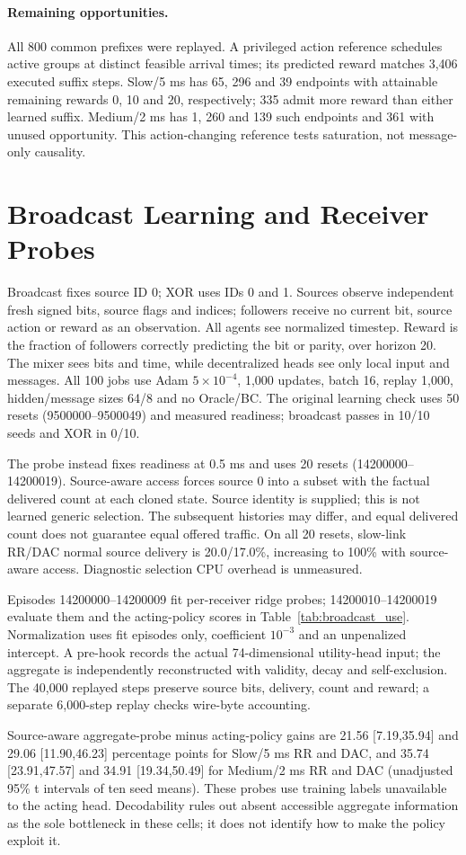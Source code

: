 \documentclass[10pt]{article}
\begin{document}
\paragraph{Remaining opportunities.}
All 800 common prefixes were replayed. A privileged action reference schedules active groups at distinct feasible arrival times; its predicted reward matches 3,406 executed suffix steps. Slow/5 ms has 65, 296 and 39 endpoints with attainable remaining rewards 0, 10 and 20, respectively; 335 admit more reward than either learned suffix. Medium/2 ms has 1, 260 and 139 such endpoints and 361 with unused opportunity. This action-changing reference tests saturation, not message-only causality.

\section{Broadcast Learning and Receiver Probes}\label{app:probe}
Broadcast fixes source ID 0; XOR uses IDs 0 and 1. Sources observe independent fresh signed bits, source flags and indices; followers receive no current bit, source action or reward as an observation. All agents see normalized timestep. Reward is the fraction of followers correctly predicting the bit or parity, over horizon 20. The mixer sees bits and time, while decentralized heads see only local input and messages. All 100 jobs use Adam $5\times10^{-4}$, 1,000 updates, batch 16, replay 1,000, hidden/message sizes 64/8 and no Oracle/BC. The original learning check uses 50 resets (9500000--9500049) and measured readiness; broadcast passes in 10/10 seeds and XOR in 0/10.

The probe instead fixes readiness at 0.5 ms and uses 20 resets (14200000--14200019). Source-aware access forces source 0 into a subset with the factual delivered count at each cloned state. Source identity is supplied; this is not learned generic selection. The subsequent histories may differ, and equal delivered count does not guarantee equal offered traffic. On all 20 resets, slow-link RR/DAC normal source delivery is 20.0/17.0\%, increasing to 100\% with source-aware access. Diagnostic selection CPU overhead is unmeasured.

Episodes 14200000--14200009 fit per-receiver ridge probes; 14200010--14200019 evaluate them and the acting-policy scores in Table~\ref{tab:broadcast_use}. Normalization uses fit episodes only, coefficient $10^{-3}$ and an unpenalized intercept. A pre-hook records the actual 74-dimensional utility-head input; the aggregate is independently reconstructed with validity, decay and self-exclusion. The 40,000 replayed steps preserve source bits, delivery, count and reward; a separate 6,000-step replay checks wire-byte accounting.

Source-aware aggregate-probe minus acting-policy gains are 21.56 [7.19,35.94] and 29.06 [11.90,46.23] percentage points for Slow/5 ms RR and DAC, and 35.74 [23.91,47.57] and 34.91 [19.34,50.49] for Medium/2 ms RR and DAC (unadjusted 95\% t intervals of ten seed means). These probes use training labels unavailable to the acting head. Decodability rules out absent accessible aggregate information as the sole bottleneck in these cells; it does not identify how to make the policy exploit it.
\end{document}
